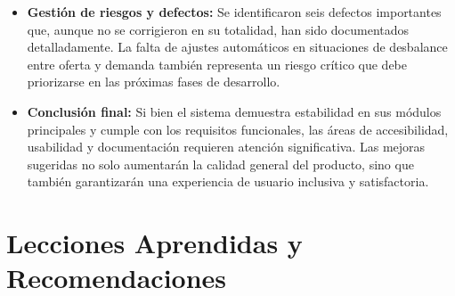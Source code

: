 \documentclass[stu, 12pt, letterpaper, donotrepeattitle, floatsintext, natbib]{apa7}
\begin{document}
\begin{itemize}
    \item \textbf{Gestión de riesgos y defectos:} Se identificaron seis defectos importantes que, aunque no se corrigieron en su totalidad, han sido documentados detalladamente. La falta de ajustes autom\'aticos en situaciones de desbalance entre oferta y demanda tambi\'en representa un riesgo cr\'itico que debe priorizarse en las pr\'oximas fases de desarrollo.

    \item \textbf{Conclusión final:} Si bien el sistema demuestra estabilidad en sus m\'odulos principales y cumple con los requisitos funcionales, las \'areas de accesibilidad, usabilidad y documentaci\'on requieren atenci\'on significativa. Las mejoras sugeridas no solo aumentar\'an la calidad general del producto, sino que tambi\'en garantizar\'an una experiencia de usuario inclusiva y satisfactoria.
\end{itemize}

\section{Lecciones Aprendidas y Recomendaciones}
\end{document}
